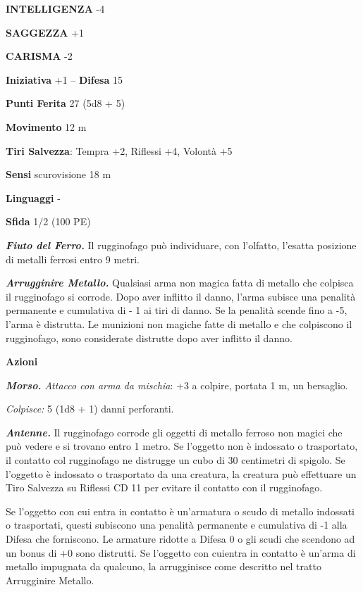 \begin{multicols}{2}
\textbf{INTELLIGENZA} -4

\textbf{SAGGEZZA} +1

\textbf{CARISMA} -2

\textbf{Iniziativa} +1 -- \textbf{Difesa} 15

\textbf{Punti Ferita} 27 (5d8 + 5)

\textbf{Movimento} 12 m

\textbf{Tiri Salvezza}: Tempra +2, Riflessi +4, Volontà +5

\textbf{Sensi} scurovisione 18 m

\textbf{Linguaggi} -

\textbf{Sfida} 1/2 (100 PE)

\emph{\textbf{Fiuto del Ferro.}} Il rugginofago può individuare, con l'olfatto, l'esatta posizione di metalli ferrosi entro 9 metri.

\emph{\textbf{Arrugginire Metallo.}} Qualsiasi arma non magica fatta di metallo che colpisca il rugginofago si corrode. Dopo aver inflitto il danno, l'arma subisce una penalità permanente e cumulativa di - 1 ai tiri di danno. Se la penalità scende fino a -5, l'arma è distrutta. Le munizioni non magiche fatte di metallo e che colpiscono il rugginofago, sono considerate distrutte dopo aver inflitto il danno.

\textbf{Azioni}

\emph{\textbf{Morso.} Attacco con arma da mischia}: +3 a colpire, portata 1 m, un bersaglio.

\emph{Colpisce:} 5 (1d8 + 1) danni perforanti.

\emph{\textbf{Antenne.}} Il rugginofago corrode gli oggetti di metallo ferroso non magici che può vedere e si trovano entro 1 metro. Se l'oggetto non è indossato o trasportato, il contatto col rugginofago ne distrugge un cubo di 30 centimetri di spigolo. Se l'oggetto è indossato o trasportato da una creatura, la creatura può effettuare un Tiro Salvezza su Riflessi CD 11 per evitare il contatto con il rugginofago.

Se l'oggetto con cui entra in contatto è un'armatura o scudo di metallo indossati o trasportati, questi subiscono una penalità permanente e cumulativa di -1 alla Difesa che forniscono. Le armature ridotte a Difesa 0 o gli scudi che scendono ad un bonus di +0 sono distrutti. Se l'oggetto con cuientra in contatto è un'arma di metallo impugnata da qualcuno, la  arrugginisce come descritto nel tratto Arrugginire Metallo.


\end{multicols}
